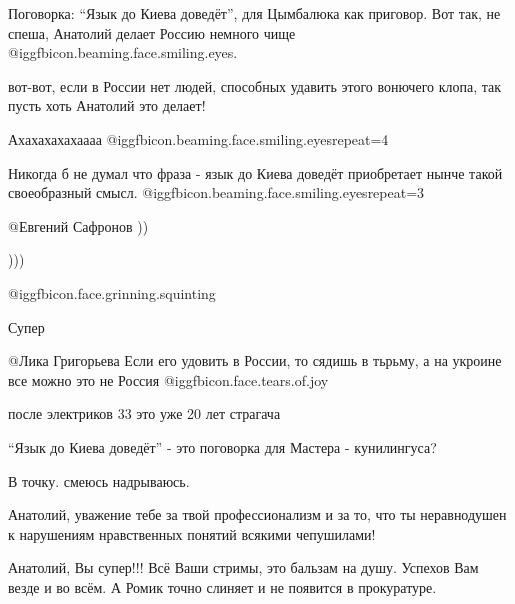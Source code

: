\begin{multicols}{2}


Поговорка: \enquote{Язык до Киева доведёт}, для Цымбалюка как приговор. Вот так, не
спеша, Анатолий делает Россию немного чище @igg{fbicon.beaming.face.smiling.eyes}.

\begin{itemize} %

вот-вот, если в России нет людей, способных  удавить этого вонючего клопа, так
пусть хоть Анатолий это делает!


Ахахахахахаааа  @igg{fbicon.beaming.face.smiling.eyes}{repeat=4} 


Никогда б не думал что фраза - язык до Киева доведёт приобретает нынче такой
своеобразный смысл. @igg{fbicon.beaming.face.smiling.eyes}{repeat=3} 


 @Евгений Сафронов  ))

)))

 @igg{fbicon.face.grinning.squinting} 

Супер


 @Лика Григорьева  Если его удовить в России, то сядишь в тьрьму, а на укроине
 все можно это не Россия @igg{fbicon.face.tears.of.joy} 

после электриков 33 это уже 20 лет страгача

\enquote{Язык до Киева доведёт} - это поговорка для Мастера - кунилингуса?

В точку. смеюсь надрываюсь.

\end{itemize} %


Анатолий, уважение тебе за твой профессионализм и за то, что ты неравнодушен к
нарушениям нравственных понятий всякими чепушилами!


Анатолий, Вы супер!!! Всё Ваши стримы, это бальзам на душу. 
Успехов Вам везде и во всём.
А Ромик точно слиняет и не появится в прокуратуре.



\end{multicols}
